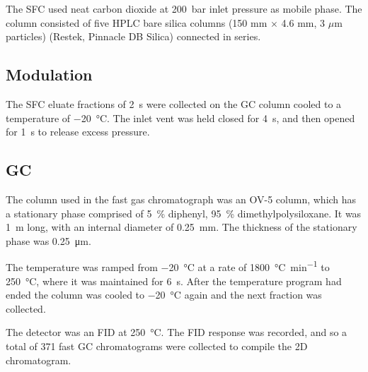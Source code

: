 The SFC used neat carbon dioxide at \SI{200}{\bar} inlet pressure as mobile
phase. The column consisted of five HPLC bare silica columns (150 mm $\times$
4.6 mm, 3 $\mu$m particles) (Restek, Pinnacle DB Silica) connected in series.

\subsection{Modulation}

The SFC eluate fractions of \SI{2}{\second} were collected on the GC column
cooled to a temperature of \SI{-20}{\celsius}. The inlet vent was held closed
for \SI{4}{\second}, and then opened for \SI{1}{\second} to release excess
pressure.

\subsection{GC}

The column used in the fast gas chromatograph was an OV-5 column, which has a
stationary phase comprised of \SI{5}{\percent} diphenyl, \SI{95}{\percent}
dimethylpolysiloxane. It was \SI{1}{\metre} long, with an internal diameter of
\SI{0.25}{\milli\metre}. The thickness of the stationary phase was
\SI{0.25}{\micro\metre}.

The temperature was ramped from \SI{-20}{\celsius} at a rate of
\SI{1800}{\celsius\per\minute} to \SI{250}{\celsius}, where it was maintained
for \SI{6}{s}. After the temperature program had ended the column was cooled to
\SI{-20}{\celsius} again and the next fraction was collected.

The detector was an FID at \SI{250}{\celsius}. The FID response was recorded,
and so a total of 371 fast GC chromatograms were collected to compile the 2D
chromatogram.

